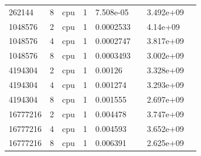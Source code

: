 \begin{tabular}{llllllll}
262144 & 8 & cpu & 1 & 7.508e-05 &  & 3.492e+09 &  \\
1048576 & 2 & cpu & 1 & 0.0002533 &  & 4.14e+09 &  \\
1048576 & 4 & cpu & 1 & 0.0002747 &  & 3.817e+09 &  \\
1048576 & 8 & cpu & 1 & 0.0003493 &  & 3.002e+09 &  \\
4194304 & 2 & cpu & 1 & 0.00126 &  & 3.328e+09 &  \\
4194304 & 4 & cpu & 1 & 0.001274 &  & 3.293e+09 &  \\
4194304 & 8 & cpu & 1 & 0.001555 &  & 2.697e+09 &  \\
16777216 & 2 & cpu & 1 & 0.004478 &  & 3.747e+09 &  \\
16777216 & 4 & cpu & 1 & 0.004593 &  & 3.652e+09 &  \\
16777216 & 8 & cpu & 1 & 0.006391 &  & 2.625e+09 &  \\
\hline
\end{tabular}
